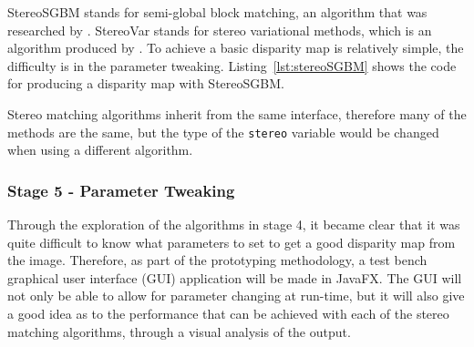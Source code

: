 \documentclass[11pt,oneside]{report}
\newcommand\code[1]{\texttt{#1}}
\begin{document}
		StereoSGBM stands for semi-global block matching, an algorithm that was researched by .
		StereoVar stands for stereo variational methods, which is an algorithm produced by . 
		To achieve a basic disparity map is relatively simple, the difficulty is in the parameter tweaking.
		Listing~\ref{lst:stereoSGBM} shows the code for producing a disparity map with StereoSGBM.
		
		Stereo matching algorithms inherit from the same interface, therefore many of the methods are the same, but the type of the \code{stereo} variable would be changed when using a different algorithm.
		
		\subsubsection{Stage 5 - Parameter Tweaking}
		Through the exploration of the algorithms in stage 4, it became clear that it was quite difficult to know what parameters to set to get a good disparity map from the image.
		Therefore, as part of the prototyping methodology, a test bench graphical user interface (GUI) application will be made in JavaFX.
		The GUI will not only be able to allow for parameter changing at run-time, but it will also give a good idea as to the performance that can be achieved with each of the stereo matching algorithms, through a visual analysis of the output.
		
\end{document}
